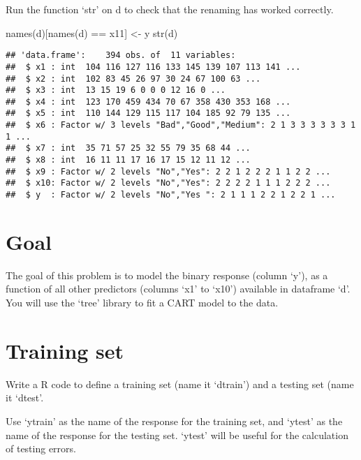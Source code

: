 \documentclass[
]{article}
\newenvironment{Shaded}{\begin{snugshade}}{\end{snugshade}}
\newcommand{\FunctionTok}[1]{\textcolor[rgb]{0.00,0.00,0.00}{#1}}
\newcommand{\NormalTok}[1]{#1}
\newcommand{\OtherTok}[1]{\textcolor[rgb]{0.56,0.35,0.01}{#1}}
\newcommand{\SpecialCharTok}[1]{\textcolor[rgb]{0.00,0.00,0.00}{#1}}
\newcommand{\StringTok}[1]{\textcolor[rgb]{0.31,0.60,0.02}{#1}}
\begin{document}
Run the function `str' on d to check that the renaming has worked
correctly.

\begin{Shaded}
\begin{Highlighting}[]
\FunctionTok{names}\NormalTok{(d)[}\FunctionTok{names}\NormalTok{(d) }\SpecialCharTok{==} \StringTok{\textquotesingle{}x11\textquotesingle{}}\NormalTok{] }\OtherTok{\textless{}{-}} \StringTok{\textquotesingle{}y\textquotesingle{}}
\FunctionTok{str}\NormalTok{(d)}
\end{Highlighting}
\end{Shaded}

\begin{verbatim}
## 'data.frame':    394 obs. of  11 variables:
##  $ x1 : int  104 116 127 116 133 145 139 107 113 141 ...
##  $ x2 : int  102 83 45 26 97 30 24 67 100 63 ...
##  $ x3 : int  13 15 19 6 0 0 0 12 16 0 ...
##  $ x4 : int  123 170 459 434 70 67 358 430 353 168 ...
##  $ x5 : int  110 144 129 115 117 104 185 92 79 135 ...
##  $ x6 : Factor w/ 3 levels "Bad","Good","Medium": 2 1 3 3 3 3 3 3 1 1 ...
##  $ x7 : int  35 71 57 25 32 55 79 35 68 44 ...
##  $ x8 : int  16 11 11 17 16 17 15 12 11 12 ...
##  $ x9 : Factor w/ 2 levels "No","Yes": 2 2 1 2 2 2 1 1 2 2 ...
##  $ x10: Factor w/ 2 levels "No","Yes": 2 2 2 2 1 1 1 2 2 2 ...
##  $ y  : Factor w/ 2 levels "No","Yes ": 2 1 1 1 2 2 1 2 2 1 ...
\end{verbatim}

\hypertarget{goal}{%
\section{Goal}\label{goal}}

The goal of this problem is to model the binary response (column `y'),
as a function of all other predictors (columns `x1' to `x10') available
in dataframe `d'. You will use the `tree' library to fit a CART model to
the data.

\hypertarget{training-set}{%
\section{Training set}\label{training-set}}

Write a R code to define a training set (name it `dtrain') and a testing
set (name it `dtest'.

Use `ytrain' as the name of the response for the training set, and
`ytest' as the name of the response for the testing set. `ytest' will be
useful for the calculation of testing errors.
\end{document}
